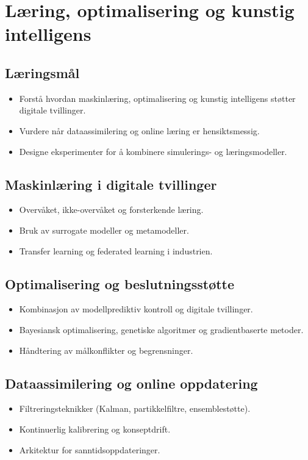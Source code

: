 \chapter{Læring, optimalisering og kunstig intelligens}

\section{Læringsmål}
\begin{itemize}
    \item Forstå hvordan maskinlæring, optimalisering og kunstig intelligens støtter digitale tvillinger.
    \item Vurdere når dataassimilering og online læring er hensiktsmessig.
    \item Designe eksperimenter for å kombinere simulerings- og læringsmodeller.
\end{itemize}

\section{Maskinlæring i digitale tvillinger}
\begin{itemize}
    \item Overvåket, ikke-overvåket og forsterkende læring.
    \item Bruk av surrogate modeller og metamodeller.
    \item Transfer learning og federated learning i industrien.
\end{itemize}

\section{Optimalisering og beslutningsstøtte}
\begin{itemize}
    \item Kombinasjon av modellprediktiv kontroll og digitale tvillinger.
    \item Bayesiansk optimalisering, genetiske algoritmer og gradientbaserte metoder.
    \item Håndtering av målkonflikter og begrensninger.
\end{itemize}

\section{Dataassimilering og online oppdatering}
\begin{itemize}
    \item Filtreringsteknikker (Kalman, partikkelfiltre, ensemblestøtte).
    \item Kontinuerlig kalibrering og konseptdrift.
    \item Arkitektur for sanntidsoppdateringer.
\end{itemize}

